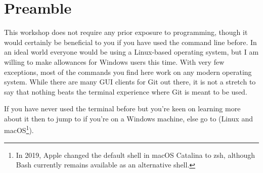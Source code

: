 \section{Preamble}\label{preamble}

\begin{flushleft}
	This workshop does not require any prior exposure to programming, though it would
	certainly be beneficial to you if you have used the command line before. In an ideal
	world everyone would be using a Linux-based operating system, but I am willing to make
	allowances for Windows users this time. With very few exceptions, most of the commands
	you find here work on any modern operating system. While there are many GUI clients for
	Git out there, it is not a stretch to say that nothing beats the terminal experience
	where Git is meant to be used.
\end{flushleft}

\begin{flushleft}
	If you have never used the terminal before but you're keen on learning more about it
	then to jump to  if you're on a Windows machine, else go to
	 (Linux and macOS\footnote{In 2019, Apple changed the default shell
		in macOS Catalina to zsh, although Bash currently remains available as an alternative
		shell.}).
\end{flushleft}

